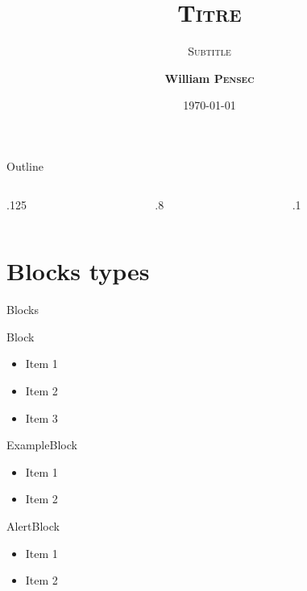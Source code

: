 \documentclass[svgnames, table, 10pt, aspectratio=169]{beamer} %
\title{\textsc{Titre}}
\subtitle{\textsc{Subtitle}}
\author[
    William \textsc{Pensec}
]{
    \textbf{William \textsc{Pensec}}
}
\institute[UJM, UMR 5516 LabHC] %
{
    {\small Université Jean Monnet,\\ UMR 5516 Laboratoire Hubert Curien} \\ \vspace{2mm}
}
\date{\today}
\begin{document}
\begin{frame}[plain]
	\titlepage
\end{frame}
\begin{frame}{Outline}
	\begin{columns}
		\begin{column}{.125\linewidth}
			\hfill
		\end{column}
		\begin{column}{.8\linewidth}
			\Large\tableofcontents
		\end{column}
		\begin{column}{.1\linewidth}
			\hfill
		\end{column}
	\end{columns}
\end{frame}
%
\section{Blocks types}
\begin{frame}{Blocks}
    \begin{block}{Block}
        \begin{itemize}
            [triangle]
            \item Item 1
            \item<1> Item 2
            \item<2> Item 3
        \end{itemize}
    \end{block}

    \begin{exampleblock}{ExampleBlock}
        \begin{itemize}
            [square]
            \item Item 1
            \item Item 2
        \end{itemize}
    \end{exampleblock}

    \begin{alertblock}{AlertBlock}
        \begin{itemize}
            [cercle]
            \item Item 1
            \item Item 2
        \end{itemize}
    \end{alertblock}
\end{frame}
%
\end{document}
